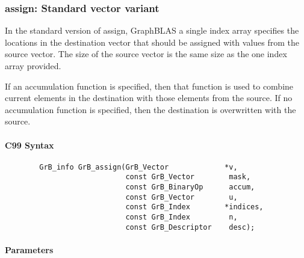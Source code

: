 


\subsubsection{{\sf assign}: Standard vector variant}

In the standard version of {\sf assign}, GraphBLAS a single index array specifies
the locations in the destination vector that should be assigned with values
from the source vector.  The size of the source vector is the same size as the one
index array provided.

If an accumulation function is specified, then that function is used
to combine current elements in the destination with those elements
from the source.  If no accumulation function is specified, then the
destination is overwritten with the source.


\paragraph{C99 Syntax}

\begin{verbatim}
        GrB_info GrB_assign(GrB_Vector             *v,
                            const GrB_Vector        mask,
                            const GrB_BinaryOp      accum,
                            const GrB_Vector        u,
                            const GrB_Index        *indices,
                            const GrB_Index         n,
                            const GrB_Descriptor    desc);
\end{verbatim}

\paragraph{Parameters}

